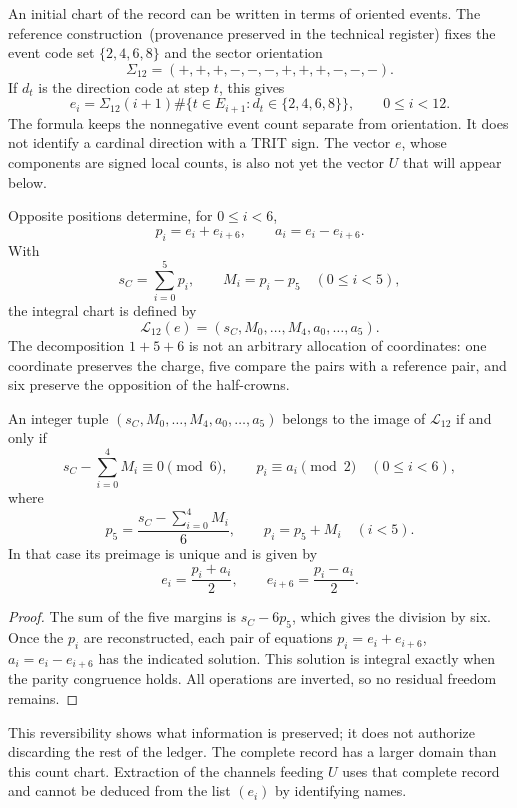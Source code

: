 An initial chart of the record can be written in terms of oriented
events. The reference construction~\textup{(provenance preserved in the technical register)} fixes the event code set
\(\{2,4,6,8\}\) and the sector orientation
\[
 \Sigma_{12}=(+,+,+,-,-,-,+,+,+,-,-,-).
\]
If \(d_t\) is the direction code at step \(t\), this gives
\[
 e_i=\Sigma_{12}(i+1)
 \#\{t\in E_{i+1}:d_t\in\{2,4,6,8\}\},
 \qquad0\leq i<12.
\]
The formula keeps the nonnegative event count separate from
orientation. It does not identify a cardinal direction with a TRIT sign. The
vector \(e\), whose components are signed local counts, is also not
yet the vector \(U\) that will appear below.

Opposite positions determine, for \(0\leq i<6\),
\[
 p_i=e_i+e_{i+6},\qquad a_i=e_i-e_{i+6}.
\]
With
\[
 s_C=\sum_{i=0}^{5}p_i,\qquad M_i=p_i-p_5\quad(0\leq i<5),
\]
the integral chart is defined by
\[
 \mathcal L_{12}(e)
 =(s_C,M_0,\ldots,M_4,a_0,\ldots,a_5).
\]
The decomposition \(1+5+6\) is not an arbitrary allocation of coordinates:
one coordinate preserves the charge, five compare the pairs with a
reference pair, and six preserve the opposition of the half-crowns.

\begin{lemma}
\label{lem:k-carta-integral}
An integer tuple \((s_C,M_0,\ldots,M_4,a_0,\ldots,a_5)\) belongs to the
image of \(\mathcal L_{12}\) if and only if
\[
 s_C-\sum_{i=0}^{4}M_i\equiv0\pmod6,
 \qquad p_i\equiv a_i\pmod2\quad(0\leq i<6),
\]
where
\[
 p_5=\frac{s_C-\sum_{i=0}^{4}M_i}{6},\qquad p_i=p_5+M_i\quad(i<5).
\]
In that case its preimage is unique and is given by
\[
 e_i=\frac{p_i+a_i}{2},\qquad e_{i+6}=\frac{p_i-a_i}{2}.
\]
\end{lemma}

\begin{proof}
The sum of the five margins is \(s_C-6p_5\), which gives the
division by six. Once the \(p_i\) are reconstructed, each pair of equations
\(p_i=e_i+e_{i+6}\), \(a_i=e_i-e_{i+6}\) has the indicated solution.
This solution is integral exactly when the parity congruence holds. All
operations are inverted, so no residual freedom remains.
\end{proof}

This reversibility shows what information is preserved; it does not authorize
discarding the rest of the ledger. The complete record has a larger domain
than this count chart. Extraction of the channels feeding
\(U\) uses that complete record and cannot be deduced from the list
\((e_i)\) by identifying names.

